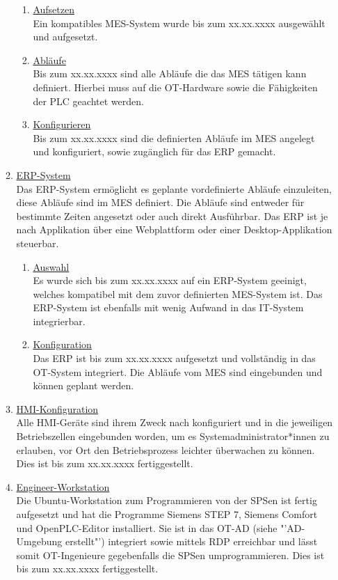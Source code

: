 \documentclass[
	headings=optiontotocandhead,%
	oneside,
	numbers=noenddot,%
	toc=flat, %
	10pt, %
	parskip=full, %
	listof=totoc, %
	listof=flat, %
	numbers=noenddot, %
	bibliography=totoc, %
	a4paper,DIV=14,
]{scrartcl}
\begin{document}
\begin{enumerate}[start=1,label={\bfseries Ziel-H \arabic*},leftmargin=*,wide]
\begin{enumerate}[label=\alph*.]
\begin{enumerate}[label=\roman*.]
\item{\underline{Aufsetzen}}\\
Ein kompatibles MES-System wurde bis zum xx.xx.xxxx ausgewählt und aufgesetzt.

\item{\underline{Abläufe}}\\
Bis zum xx.xx.xxxx sind alle Abläufe die das MES tätigen kann definiert. Hierbei muss auf die OT-Hardware sowie die Fähigkeiten der PLC geachtet werden.

\item{\underline{Konfigurieren}}\\
Bis zum xx.xx.xxxx sind die definierten Abläufe im MES angelegt und konfiguriert, sowie zugänglich für das ERP gemacht.
\end{enumerate}

\item{\underline{ERP-System}}\\
Das ERP-System ermöglicht es geplante vordefinierte Abläufe einzuleiten, diese Abläufe sind im MES definiert. Die Abläufe sind entweder für bestimmte Zeiten angesetzt oder auch direkt Ausführbar. Das ERP ist je nach Applikation über eine Webplattform oder einer Desktop-Applikation steuerbar.

\begin{enumerate}[label=\roman*.]
\item{\underline{Auswahl}}\\
Es wurde sich bis zum xx.xx.xxxx auf ein ERP-System geeinigt, welches kompatibel mit dem zuvor definierten MES-System ist. Das ERP-System ist ebenfalls mit wenig Aufwand in das IT-System integrierbar.

\item{\underline{Konfiguration}}\\
Das ERP ist bis zum xx.xx.xxxx aufgesetzt und vollständig in das OT-System integriert. Die Abläufe vom MES sind eingebunden und können geplant werden.
\end{enumerate}

\item{\underline{HMI-Konfiguration}}\\
Alle HMI-Geräte sind ihrem Zweck nach konfiguriert und in die jeweiligen Betriebszellen eingebunden worden, um es Systemadministrator*innen zu erlauben, vor Ort den Betriebsprozess leichter überwachen zu können. Dies ist bis zum xx.xx.xxxx fertiggestellt.

\item{\underline{Engineer-Workstation}}\\
Die Ubuntu-Workstation zum Programmieren von der SPSen ist fertig aufgesetzt und hat die Programme Siemens STEP 7, Siemens Comfort und OpenPLC-Editor installiert. Sie ist in das OT-AD (siehe "'AD-Umgebung erstellt"') integriert sowie mittels RDP erreichbar und lässt somit OT-Ingenieure gegebenfalls die SPSen umprogrammieren. Dies ist bis zum xx.xx.xxxx fertiggestellt.


\end{enumerate}
\end{enumerate}
\end{document}
